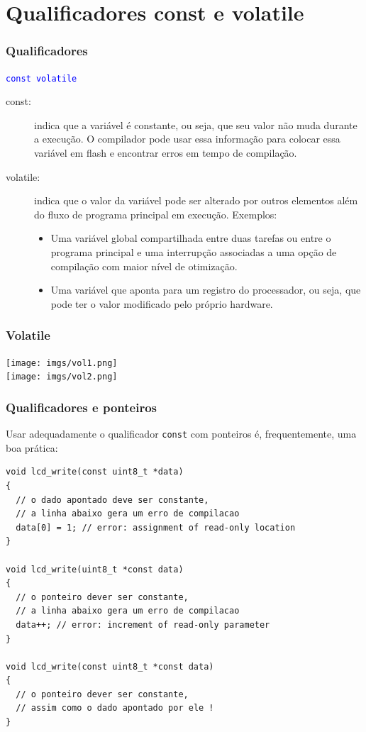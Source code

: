 \documentclass{beamer}
\begin{document}
\section{Qualificadores const e volatile}

\begin{frame}
	\frametitle{Qualificadores}
	\begin{center}
		\texttt{\textcolor{blue}{const volatile}}
	\end{center}
		\vspace*{0.5cm}
	\begin{description}
	\item [const:] indica que a variável é constante, ou seja, que seu valor não muda durante a execução. O compilador pode usar essa informação para colocar essa variável em flash e encontrar erros em tempo de compilação.
	\item [volatile:] indica que o valor da variável pode ser alterado por outros elementos além do fluxo de programa principal em execução. Exemplos:
    {\footnotesize
    \begin{itemize}
    \item Uma variável global compartilhada entre duas tarefas ou entre o programa principal e uma interrupção associadas a uma opção de compilação com maior nível de otimização.
    \item Uma variável que aponta para um registro do processador, ou seja, que pode ter o valor modificado pelo próprio hardware.
    \end{itemize}
    }
	\end{description}
\end{frame}

\begin{frame}
	\frametitle{Volatile}
	\begin{center}
		\texttt{[image: imgs/vol1.png]} \\
		\texttt{[image: imgs/vol2.png]}
	\end{center}
\end{frame}


\begin{frame}[fragile]
	\frametitle{Qualificadores e ponteiros}
    Usar adequadamente o qualificador \texttt{const} com ponteiros é, frequentemente, uma boa prática:
		\vspace*{0.5cm}
	\begin{lstlisting}[style=customc]
void lcd_write(const uint8_t *data)
{
  // o dado apontado deve ser constante,
  // a linha abaixo gera um erro de compilacao
  data[0] = 1; // error: assignment of read-only location
}

void lcd_write(uint8_t *const data)
{
  // o ponteiro dever ser constante,
  // a linha abaixo gera um erro de compilacao
  data++; // error: increment of read-only parameter
}

void lcd_write(const uint8_t *const data)
{
  // o ponteiro dever ser constante,
  // assim como o dado apontado por ele !
}
	\end{lstlisting}
\end{frame}
\end{document}

